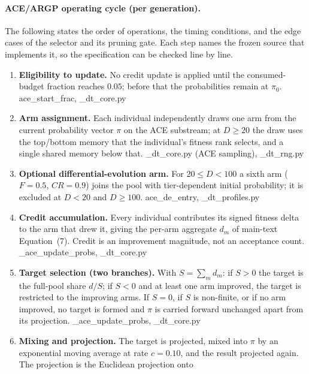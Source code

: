 \documentclass[algorithms,article,submit,moreauthors,pdftex]{Definitions/mdpi}
\begin{document}
\paragraph{ACE/ARGP operating cycle (per generation).}
The following states the order of operations, the timing conditions, and the
edge cases of the selector and its pruning gate. Each step names the frozen
source that implements it, so the specification can be checked line by line.

\begin{enumerate}\itemsep2pt
\item \textbf{Eligibility to update.} No credit update is applied until the
  consumed-budget fraction reaches $0.05$; before that the probabilities remain
  at $\pi_0$. \hfill ace\_start\_frac, \_dt\_core.py
\item \textbf{Arm assignment.} Each individual independently draws one arm from
  the current probability vector $\pi$ on the ACE substream; at $D\ge 20$ the
  draw uses the top/bottom memory that the individual's fitness rank selects,
  and a single shared memory below that.
  \hfill\_dt\_core.py (ACE sampling), \_dt\_rng.py
\item \textbf{Optional differential-evolution arm.} For $20\le D<100$ a sixth
  arm ($F=0.5$, $CR=0.9$) joins the pool with tier-dependent initial
  probability; it is excluded at $D<20$ and $D\ge 100$.
  \hfill ace\_de\_entry, \_dt\_profiles.py
\item \textbf{Credit accumulation.} Every individual contributes its signed
  fitness delta to the arm that drew it, giving the per-arm aggregate $d_m$ of
  main-text Equation~(7). Credit is an improvement magnitude, not an acceptance
  count. \hfill\_ace\_update\_probs, \_dt\_core.py
\item \textbf{Target selection (two branches).} With $S=\sum_m d_m$: if $S>0$
  the target is the full-pool share $d/S$; if $S<0$ and at least one arm
  improved, the target is restricted to the improving arms. If $S=0$, if $S$ is
  non-finite, or if no arm improved, no target is formed and $\pi$ is carried
  forward unchanged apart from its projection.
  \hfill\_ace\_update\_probs, \_dt\_core.py
\item \textbf{Mixing and projection.} The target is projected, mixed into $\pi$
  by an exponential moving average at rate $c=0.10$, and the result projected
  again. The projection is the Euclidean projection onto

\end{enumerate}
\end{document}
